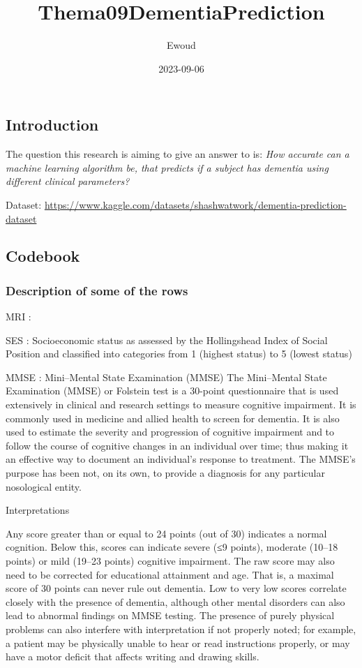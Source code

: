 \documentclass[
]{article}
\title{Thema09DementiaPrediction}
\author{Ewoud}
\date{2023-09-06}
\begin{document}
\maketitle

\hypertarget{introduction}{%
\subsection{Introduction}\label{introduction}}

The question this research is aiming to give an answer to is: \emph{How
accurate can a machine learning algorithm be, that predicts if a subject
has dementia using different clinical parameters?}

Dataset:
\url{https://www.kaggle.com/datasets/shashwatwork/dementia-prediction-dataset}

\hypertarget{codebook}{%
\subsection{Codebook}\label{codebook}}

\hypertarget{description-of-some-of-the-rows}{%
\subsubsection{Description of some of the
rows}\label{description-of-some-of-the-rows}}

MRI :

SES : Socioeconomic status as assessed by the Hollingshead Index of
Social Position and classified into categories from 1 (highest status)
to 5 (lowest status)

MMSE : Mini--Mental State Examination (MMSE) The Mini--Mental State
Examination (MMSE) or Folstein test is a 30-point questionnaire that is
used extensively in clinical and research settings to measure cognitive
impairment. It is commonly used in medicine and allied health to screen
for dementia. It is also used to estimate the severity and progression
of cognitive impairment and to follow the course of cognitive changes in
an individual over time; thus making it an effective way to document an
individual's response to treatment. The MMSE's purpose has been not, on
its own, to provide a diagnosis for any particular nosological entity.

Interpretations

Any score greater than or equal to 24 points (out of 30) indicates a
normal cognition. Below this, scores can indicate severe (≤9 points),
moderate (10--18 points) or mild (19--23 points) cognitive impairment.
The raw score may also need to be corrected for educational attainment
and age. That is, a maximal score of 30 points can never rule out
dementia. Low to very low scores correlate closely with the presence of
dementia, although other mental disorders can also lead to abnormal
findings on MMSE testing. The presence of purely physical problems can
also interfere with interpretation if not properly noted; for example, a
patient may be physically unable to hear or read instructions properly,
or may have a motor deficit that affects writing and drawing skills.
\end{document}
